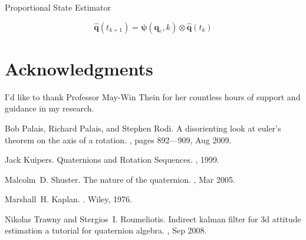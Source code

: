\documentclass[]{aiaa-tc}%
\newcommand{\bs}[1]{\boldsymbol{#1}}
\begin{document}
Proportional State Estimator

\begin{equation}
  \bs{\hat{q}}(t_{k+1}) = \bs{\psi}(\bs{q}_e, k) \otimes \bs{\hat{q}}(t_{k})
\end{equation}

\section*{Acknowledgments}

I'd like to thank Professor May-Win Thein for her countless hours of support and guidance in my research.

\begin{thebibliography}{9}%
Bob Palais, Richard Palais, and Stephen Rodi.
\newblock A disorienting look at euler’s theorem on the axis of a rotation.
, pages 892–--909, Aug 2009.

Jack Kuipers.
\newblock Quaternions and Rotation Sequences.
, 1999.

Malcolm~D. Shuster.
\newblock The nature of the quaternion.
, Mar 2005.


Marshall~H. Kaplan.
.
\newblock Wiley, 1976.

Nikolas Trawny and Stergios~I. Roumeliotis.
\newblock Indirect kalman filter for 3d attitude estimation a tutorial for
  quaternion algebra.
, Sep 2008.


\end{thebibliography}
\end{document}
